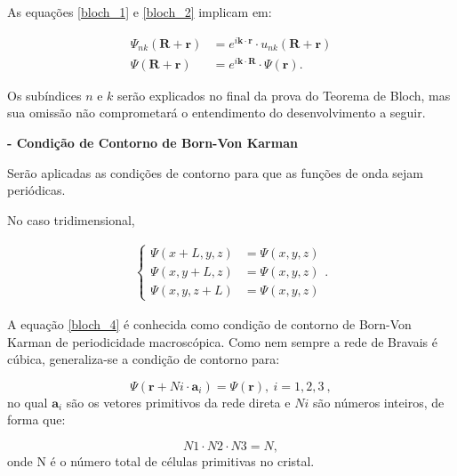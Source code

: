 	As equações \eqref{bloch_1} e \eqref{bloch_2} implicam em:

	\begin{align}
		\label{bloch_3}
		\Psi_{nk}(\mathbf{R} + \mathbf{r}) &= e^{i\mathbf{k} \cdot \mathbf{r}}\cdot u_{nk}(\mathbf{R} + \mathbf{r})\\
		\Psi(\mathbf{R} + \mathbf{r}) &= e^{i\mathbf{k} \cdot \mathbf{R}}\cdot \Psi(\mathbf{r}).
	\end{align}

	\par Os subíndices $n$ e $k$ serão explicados no final da prova do Teorema de Bloch, mas sua omissão não comprometará o entendimento do desenvolvimento a seguir.


	\par \textbf{- Condição de Contorno de Born-Von Karman}

		\par Serão aplicadas as condições de contorno para que as funções de onda sejam periódicas.
		
		\par No caso tridimensional,

		\begin{align}\label{bloch_4}
	        \left\{
	          \begin{array}{ll}
	            \displaystyle \Psi(x+L, y, z) &= \Psi(x, y, z)\\
	            \displaystyle \Psi(x, y+L, z) &= \Psi(x, y, z)\\
	            \displaystyle \Psi(x, y, z+L) &= \Psi(x, y, z)
	          \end{array}
	        \right.
	        .
	      \end{align}
		
		\par A equação \eqref{bloch_4} é conhecida como condição de contorno de Born-Von Karman de periodicidade macroscópica.  Como nem sempre a rede de Bravais é cúbica, generaliza-se a condição de contorno para:

		\begin{equation}
			\label{blochh_5}
			\Psi(\mathbf{r} + N i\cdot \mathbf{a}_{i}) = \Psi(\mathbf{r}),\ i=1,2,3\ ,
		\end{equation}
		no qual $\mathbf{a}_{i}$ são os vetores primitivos da rede direta e $Ni$ são números inteiros, de forma que:

		\begin{equation}
			\label{bloch_6}
			N1 \cdot N2 \cdot N3 = N,
		\end{equation}
		onde N é o número total de células primitivas no cristal.

